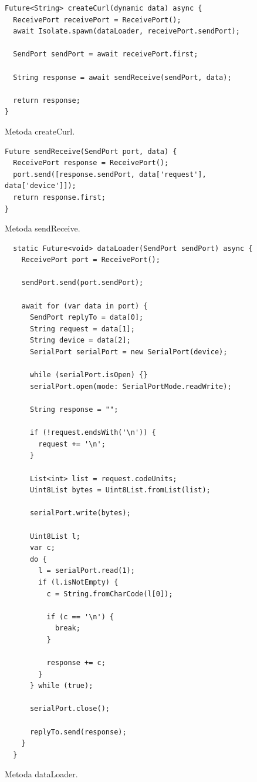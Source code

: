 \documentclass[a4paper,twoside,12pt]{book}
\begin{document}
\begin{figure}[H]
   \centering
   \footnotesize
   \begin{lstlisting}
Future<String> createCurl(dynamic data) async {
  ReceivePort receivePort = ReceivePort();
  await Isolate.spawn(dataLoader, receivePort.sendPort);

  SendPort sendPort = await receivePort.first;

  String response = await sendReceive(sendPort, data);

  return response;
}
   \end{lstlisting}
   \caption{Metoda createCurl.}
   \label{code:16}
\end{figure}

\begin{figure}[H]
   \centering
   \footnotesize
   \begin{lstlisting}
Future sendReceive(SendPort port, data) {
  ReceivePort response = ReceivePort();
  port.send([response.sendPort, data['request'], data['device']]);
  return response.first;
}
   \end{lstlisting}
   \caption{Metoda sendReceive.}
   \label{code:17}
\end{figure}

\begin{figure}[H]
   \centering
   \footnotesize
   \begin{lstlisting}
  static Future<void> dataLoader(SendPort sendPort) async {
    ReceivePort port = ReceivePort();

    sendPort.send(port.sendPort);

    await for (var data in port) {
      SendPort replyTo = data[0];
      String request = data[1];
      String device = data[2];
      SerialPort serialPort = new SerialPort(device);

      while (serialPort.isOpen) {}
      serialPort.open(mode: SerialPortMode.readWrite);

      String response = "";

      if (!request.endsWith('\n')) {
        request += '\n';
      }

      List<int> list = request.codeUnits;
      Uint8List bytes = Uint8List.fromList(list);

      serialPort.write(bytes);

      Uint8List l;
      var c;
      do {
        l = serialPort.read(1);
        if (l.isNotEmpty) {
          c = String.fromCharCode(l[0]);

          if (c == '\n') {
            break;
          }

          response += c;
        }
      } while (true);

      serialPort.close();

      replyTo.send(response);
    }
  }
   \end{lstlisting}
   \caption{Metoda dataLoader.}
   \label{code:18}
\end{figure}
\end{document}
